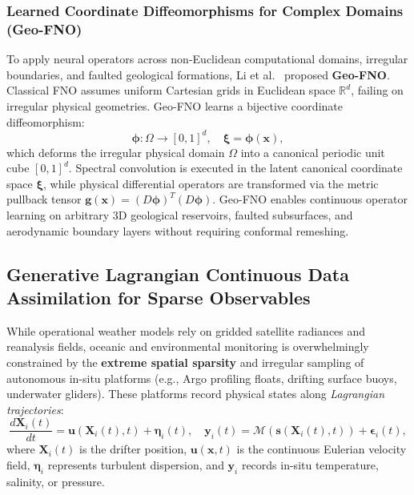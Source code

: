 \subsubsection{Learned Coordinate Diffeomorphisms for Complex Domains (Geo-FNO)}
To apply neural operators across non-Euclidean computational domains, irregular boundaries, and faulted geological formations, Li et al.~\cite{li2022geofno} proposed \textbf{Geo-FNO}. Classical FNO assumes uniform Cartesian grids in Euclidean space $\mathbb{R}^d$, failing on irregular physical geometries. Geo-FNO learns a bijective coordinate diffeomorphism:
\begin{equation}
    \boldsymbol{\phi}: \Omega \to [0, 1]^d, \quad \boldsymbol{\xi} = \boldsymbol{\phi}(\mathbf{x}),
\end{equation}
which deforms the irregular physical domain $\Omega$ into a canonical periodic unit cube $[0, 1]^d$. Spectral convolution is executed in the latent canonical coordinate space $\boldsymbol{\xi}$, while physical differential operators are transformed via the metric pullback tensor $\mathbf{g}(\mathbf{x}) = (D\boldsymbol{\phi})^T (D\boldsymbol{\phi})$. Geo-FNO enables continuous operator learning on arbitrary 3D geological reservoirs, faulted subsurfaces, and aerodynamic boundary layers without requiring conformal remeshing.

\subsection{Generative Lagrangian Continuous Data Assimilation for Sparse Observables}
\label{sec:lagrangian_data_assimilation}
While operational weather models rely on gridded satellite radiances and reanalysis fields, oceanic and environmental monitoring is overwhelmingly constrained by the \textbf{extreme spatial sparsity} and irregular sampling of autonomous in-situ platforms (e.g., Argo profiling floats, drifting surface buoys, underwater gliders). These platforms record physical states along \textit{Lagrangian trajectories}:
\begin{equation}
    \frac{d\mathbf{X}_i(t)}{dt} = \mathbf{u}(\mathbf{X}_i(t), t) + \boldsymbol{\eta}_i(t), \quad \mathbf{y}_i(t) = \mathcal{M}(\mathbf{s}(\mathbf{X}_i(t), t)) + \boldsymbol{\epsilon}_i(t),
    \label{eq:drifter_kinematics}
\end{equation}
where $\mathbf{X}_i(t)$ is the drifter position, $\mathbf{u}(\mathbf{x}, t)$ is the continuous Eulerian velocity field, $\boldsymbol{\eta}_i$ represents turbulent dispersion, and $\mathbf{y}_i$ records in-situ temperature, salinity, or pressure.

